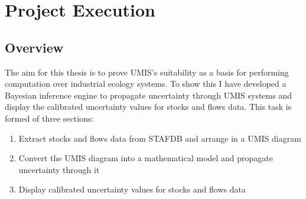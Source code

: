 \documentclass[ %
                    author={Tom Jager},
                supervisor={Dr. Daniel Schien},
                    degree={MEng},
                     title={A Bayesian Inference Engine for UMIS Structured Data},
                  subtitle={},
                      type={research},
                      year={2019} ]{dissertation}
\begin{document}


\chapter{Project Execution}
\label{chap:execution}

\section{Overview}
The aim for this thesis is to prove UMIS's suitability as a basis for performing computation over industrial ecology systems. To show this I have developed a Bayesian inference engine to propagate uncertainty through UMIS systems and display the calibrated uncertainty values for stocks and flows data. This task is formed of three sections:

\begin{enumerate}
    \item Extract stocks and flows data from STAFDB and arrange in a UMIS diagram
    \item Convert the UMIS diagram into a mathematical model and propagate uncertainty through it
    \item Display calibrated uncertainty values for stocks and flows data
\end{enumerate}

\end{document}
